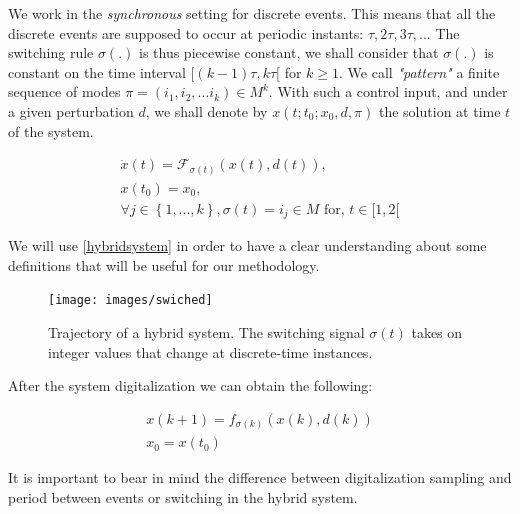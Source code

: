     We work in the \emph{synchronous} setting for discrete events. This means
    that all the discrete events are supposed to occur at periodic instants:
    $\tau, 2\tau, 3\tau, ...$ The switching rule $\sigma(.)$ is thus piecewise
    constant, we shall consider that $\sigma(.)$ is constant on the time interval
    $[(k-1)\tau,k\tau[$ for $k \geqslant 1 $. We call \emph{"pattern"} a finite
    sequence of modes $\pi =  (i_1,i_2,...i_k) \in M^k$. With such a control
    input, and under a given perturbation $d$, we shall denote by $x(t;t_0;x_0,d,\pi)$
    the solution at time $t$ of the system.
    
    \begin{equation} %
        \begin{array}{l}
            \dot x (t) = \mathcal{F}_{\sigma(t)}(x(t),d(t)), \\
            x(t_0) = x_0, \\
            \forall j \in \left\lbrace 1, ... , k \right\rbrace, \sigma(t)=i_j
            \in M \text{ for, } t \in \lbrack 1,2 \lbrack
        \end{array}
        \label{hybridsystem}
    \end{equation}

    We will use \ref{hybridsystem} in order to have a clear understanding about
    some definitions that will be useful for our methodology.

    \begin{figure}[!h]
        \begin{center}
            \texttt{[image: images/swiched]}
            \captionsetup{format=hang}
            \caption{Trajectory of a hybrid system. The switching signal
            ${\sigma(t)}$ takes on integer values that change at 
            discrete-time instances.\citep{liberzon2003switching}}
        \end{center}
    \end{figure}

    After the system digitalization we can obtain the following:

    \begin{eqnarray}
      \label{eq:digitalhybridsystem}
      x(k+1) = f_{\sigma(k)}(x(k),d(k))  \\   
      x_0    = x(t_0)
    \end{eqnarray}

    It is important to bear in mind the difference between digitalization sampling
    and period between events or switching in the hybrid system.

